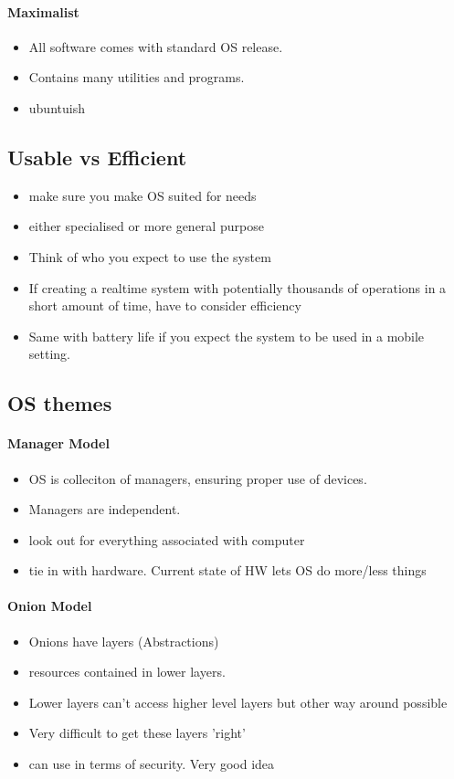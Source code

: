 \documentclass{article}
\newcommand\tab[1][0.5cm]{\hspace*{#1}}
\begin{document}
		\paragraph{\tab Maximalist}
		\begin{itemize}
			\item All software comes with standard OS release.
			\item Contains many utilities and programs.
			\item ubuntuish
		\end{itemize}

	\subsection{Usable vs Efficient}
		\begin{itemize}
			\item make sure you make OS suited for needs
			\item either specialised or more general purpose
			\item Think of who you expect to use the system
			\item If creating a realtime system with potentially thousands of operations in a short amount of time, have to consider efficiency
			\item Same with battery life if you expect the system to be used in a mobile setting.
		\end{itemize}

	\subsection{OS themes}
		\paragraph{\tab Manager Model}
			\begin{itemize}
				\item OS is colleciton of managers, ensuring proper use of devices.
				\item Managers are independent.
				\item look out for everything associated with computer 
				\item tie in with hardware. Current state of HW lets OS do more/less things
			\end{itemize}


		\paragraph{\tab Onion Model}
			\begin{itemize}
				\item Onions have layers (Abstractions)
				\item resources contained in lower layers. 
				\item Lower layers can't access higher level layers but other way around possible
				\item Very difficult to get these layers 'right'
				\item can use in terms of security. Very good idea
			\end{itemize}
\end{document}
